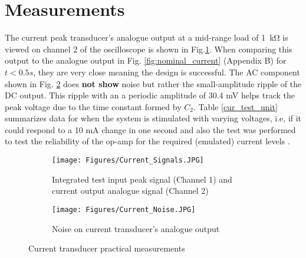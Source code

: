 \section{Measurements} \label{sec:measurements_current}

The current peak transducer's analogue output at a mid-range load of \SI{1}{\kilo\ohm} is viewed on channel 2 of the oscilloscope is shown in Fig.\ref{subfig:current_sig}. When comparing this output to the analogue output in Fig. \ref{fig:nominal_current} (Appendix B) for $t<0.5s$, they are very close meaning the design is successful. The AC component shown in Fig. \ref{subfig:current_noise} does \textbf{not show} noise but rather the small-amplitude ripple of the DC output. This ripple with an a periodic amplitude of 30.4 mV helps track the peak voltage due to the time constant formed by $C_2$. Table \ref{cur_test_unit} summarizes data for when the system is stimulated with varying voltages, i.e, if it could respond to a 10 mA change in one second and also the test was performed to test the reliability of the op-amp for the required (emulated) current levels \cite{assignment_2}.


 \begin{figure}[H]
\centering
\begin{subfigure}{.5\textwidth}
  \centering
  \texttt{[image: Figures/Current\_Signals.JPG]}
    \caption{Integrated test input peak signal  (Channel 1) and current output analogue signal (Channel 2)}
    \label{subfig:current_sig}
\end{subfigure}%
\begin{subfigure}{.5\textwidth}
  \centering
  \texttt{[image: Figures/Current\_Noise.JPG]}
   \caption{Noise on current transducer's analogue output}
    \label{subfig:current_noise}
\end{subfigure}
\label{current_practical}
\caption{Current transducer practical measurements}
\end{figure}

